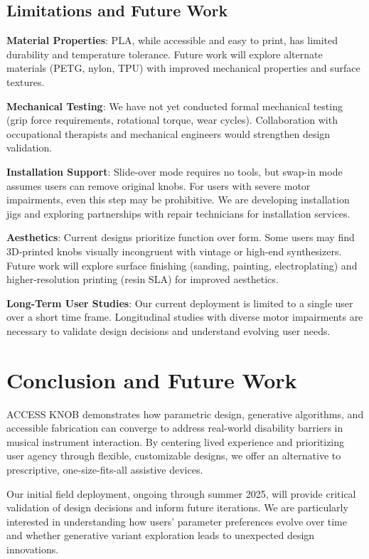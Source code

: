 \documentclass[sigconf]{nimeart}
\begin{document}
\subsection{Limitations and Future Work}

\textbf{Material Properties}: PLA, while accessible and easy to print, has limited durability and temperature tolerance. Future work will explore alternate materials (PETG, nylon, TPU) with improved mechanical properties and surface textures.

\textbf{Mechanical Testing}: We have not yet conducted formal mechanical testing (grip force requirements, rotational torque, wear cycles). Collaboration with occupational therapists and mechanical engineers would strengthen design validation.

\textbf{Installation Support}: Slide-over mode requires no tools, but swap-in mode assumes users can remove original knobs. For users with severe motor impairments, even this step may be prohibitive. We are developing installation jigs and exploring partnerships with repair technicians for installation services.

\textbf{Aesthetics}: Current designs prioritize function over form. Some users may find 3D-printed knobs visually incongruent with vintage or high-end synthesizers. Future work will explore surface finishing (sanding, painting, electroplating) and higher-resolution printing (resin SLA) for improved aesthetics.

\textbf{Long-Term User Studies}: Our current deployment is limited to a single user over a short time frame. Longitudinal studies with diverse motor impairments are necessary to validate design decisions and understand evolving user needs.


\section{Conclusion and Future Work}

ACCESS KNOB demonstrates how parametric design, generative algorithms, and accessible fabrication can converge to address real-world disability barriers in musical instrument interaction. By centering lived experience and prioritizing user agency through flexible, customizable designs, we offer an alternative to prescriptive, one-size-fits-all assistive devices.

Our initial field deployment, ongoing through summer 2025, will provide critical validation of design decisions and inform future iterations. We are particularly interested in understanding how users' parameter preferences evolve over time and whether generative variant exploration leads to unexpected design innovations.
\end{document}
